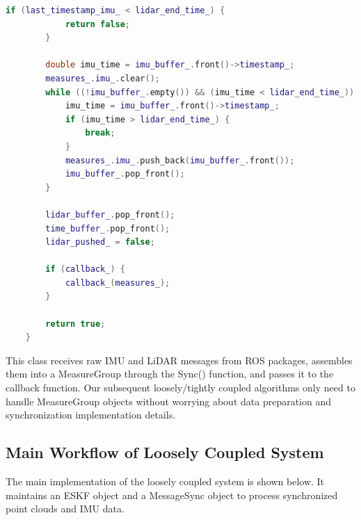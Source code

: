 \begin{lstlisting}[language=c++,caption=src/ch7/loosly_coupled_lio/measure_sync.h]
		if (last_timestamp_imu_ < lidar_end_time_) {
			return false;
		}
		
		double imu_time = imu_buffer_.front()->timestamp_;
		measures_.imu_.clear();
		while ((!imu_buffer_.empty()) && (imu_time < lidar_end_time_)) {
			imu_time = imu_buffer_.front()->timestamp_;
			if (imu_time > lidar_end_time_) {
				break;
			}
			measures_.imu_.push_back(imu_buffer_.front());
			imu_buffer_.pop_front();
		}
		
		lidar_buffer_.pop_front();
		time_buffer_.pop_front();
		lidar_pushed_ = false;
		
		if (callback_) {
			callback_(measures_);
		}
		
		return true;
	}
\end{lstlisting}

This class receives raw IMU and LiDAR messages from ROS packages, assembles them into a MeasureGroup through the Sync() function, and passes it to the callback function. Our subsequent loosely/tightly coupled algorithms only need to handle MeasureGroup objects without worrying about data preparation and synchronization implementation details.

\subsection{Main Workflow of Loosely Coupled System}
The main implementation of the loosely coupled system is shown below. It maintains an ESKF object and a MessageSync object to process synchronized point clouds and IMU data.

